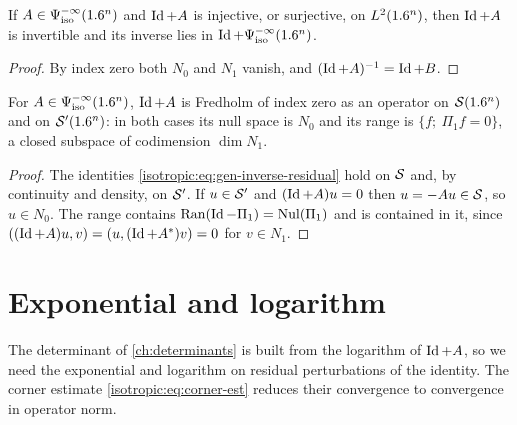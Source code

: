 \begin{corollary}\label{isotropic:cor:invertible}
If $A\in\Psi^{-\infty}_{\mathrm{iso}}(1.6^n)$ and $\operatorname{Id}+A$ is injective, or surjective, on
$L^2(1.6^n)$, then $\operatorname{Id}+A$ is invertible and its inverse lies in
$\operatorname{Id}+\Psi^{-\infty}_{\mathrm{iso}}(1.6^n)$.
\end{corollary}
\begin{proof}
By index zero both $N_0$ and $N_1$ vanish, and $(\operatorname{Id}+A)^{-1}=\operatorname{Id}+B$.
\end{proof}

\begin{corollary}\label{isotropic:cor:Id+A-S}
For $A\in\Psi^{-\infty}_{\mathrm{iso}}(1.6^n)$, $\operatorname{Id}+A$ is Fredholm of index zero as an
operator on $\mathcal{S}(1.6^n)$ and on $\mathcal{S}'(1.6^n)$: in both cases its null space is
$N_0$ and its range is $\{f;\ \Pi_1f=0\}$, a closed subspace of codimension
$\dim N_1$.
\end{corollary}
\begin{proof}
The identities \eqref{isotropic:eq:gen-inverse-residual} hold on $\mathcal{S}$ and, by
continuity and density, on $\mathcal{S}'$. If $u\in\mathcal{S}'$ and $(\operatorname{Id}+A)u=0$ then
$u=-Au\in\mathcal{S}$, so $u\in N_0$. The range contains $\operatorname{Ran}(\operatorname{Id}-\Pi_1)=\operatorname{Nul}(\Pi_1)$
and is contained in it, since $((\operatorname{Id}+A)u,v)=(u,(\operatorname{Id}+A^*)v)=0$ for $v\in N_1$.
\end{proof}

\section{Exponential and logarithm}\label{isotropic:sec:exp}

The determinant of \cref{ch:determinants} is built from the logarithm of
$\operatorname{Id}+A$, so we need the exponential and logarithm on residual
perturbations of the identity. The corner estimate
\eqref{isotropic:eq:corner-est} reduces their convergence to convergence in
operator norm.

